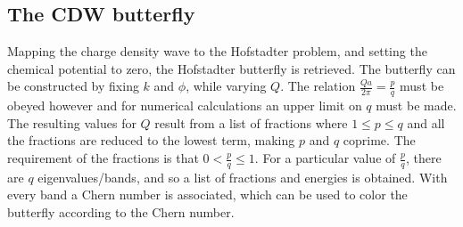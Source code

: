 \documentclass[letterpaper, 10 pt, conference]{ieeeconf}  %
\begin{document}
\subsection{The CDW butterfly}
Mapping the charge density wave to the Hofstadter problem, and setting the chemical potential to zero, the Hofstadter butterfly is retrieved.
The butterfly can be constructed by fixing $k$ and $\phi$, while varying $Q$.
The relation $\frac{Q a}{2 \pi} = \frac{p}{q}$ must be obeyed however and for numerical calculations an upper limit on $q$ must be made.
The resulting values for $Q$ result from a list of fractions where 
$1 \leq p \leq q$ and all the fractions are reduced to the lowest term, making $p$ and $q$ coprime. 
The requirement of the fractions is that
$0 < \frac{p}{q} \leq 1$.
For a particular value of $\frac{p}{q}$, there are $q$ eigenvalues/bands, and so a list of fractions and energies is obtained.
With every band a Chern number is associated, which can be used to color the butterfly according to the Chern number.
\end{document}
